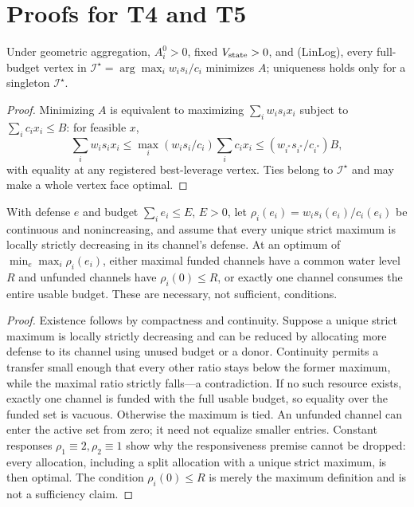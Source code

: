 \section{Proofs for T4 and T5}\label{app:t4t5}

\begin{proposition}
Under geometric aggregation, $A_i^0>0$, fixed $V_{\mathrm{state}}>0$, and
\textup{(LinLog)}, every full-budget vertex in
$\mathcal I^\star=\arg\max_iw_is_i/c_i$ minimizes $A$; uniqueness holds only
for a singleton $\mathcal I^\star$.
\end{proposition}
\begin{proof}
Minimizing $A$ is equivalent to maximizing $\sum_iw_is_ix_i$ subject to
$\sum_ic_ix_i\le B$: for feasible $x$,
\[
\sum_iw_is_ix_i\le\max_i(w_is_i/c_i)\sum_i c_ix_i
\le (w_{i^*}s_{i^*}/c_{i^*})B,
\]
with equality at any registered best-leverage vertex. Ties belong to
$\mathcal I^\star$ and may make a whole vertex face optimal.
\end{proof}

\begin{proposition}
With defense $e$ and budget $\sum_ie_i\le E$, $E>0$, let
$\rho_i(e_i)=w_is_i(e_i)/c_i(e_i)$ be continuous and nonincreasing, and assume
that every unique strict maximum is locally strictly decreasing in its
channel's defense. At an optimum of $\min_e\max_i\rho_i(e_i)$, either maximal
funded channels have a common water level $R$ and unfunded channels have
$\rho_i(0)\le R$, or exactly one channel consumes the entire usable budget.
These are necessary, not sufficient, conditions.
\end{proposition}
\begin{proof}
Existence follows by compactness and continuity. Suppose a unique strict
maximum is locally strictly decreasing and can be reduced by allocating more
defense to its channel using unused budget or a donor. Continuity permits a
transfer small enough that every other ratio stays below the former maximum,
while the maximal ratio strictly falls---a contradiction. If no such resource
exists, exactly one channel is funded with the full usable budget, so equality
over the funded set is vacuous. Otherwise the maximum is tied. An unfunded
channel can enter the active set from zero; it need not equalize smaller
entries. Constant responses $\rho_1\equiv2,\rho_2\equiv1$ show why the
responsiveness premise cannot be dropped: every allocation, including a split
allocation with a unique strict maximum, is then optimal. The condition
$\rho_i(0)\le R$ is merely the maximum definition and is not a sufficiency
claim.
\end{proof}

